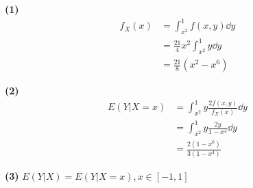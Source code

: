 \documentclass{article}
\begin{document}
    \textbf{(1)}
    \begin{equation}
        \begin{aligned}
            f_X(x) &= \int_{x^2}^1 f(x, y)\dd y \\
            &= \frac{21}{4}x^2\int_{x^2}^1 y\dd y \\
            &= \frac{21}{8}\left(x^2 - x^6\right)
        \end{aligned}
    \end{equation}

    \textbf{(2)}
    \begin{equation}
        \begin{aligned}
            E(Y|X = x) &= \int_{x^2}^{1} y\frac{2f(x, y)}{f_X(x)}\dd y \\
            &= \int_{x^2}^{1} y\frac{2y}{1 - x^4}\dd y \\
            &= \frac{2(1 - x^6)}{3(1 - x^4)}
        \end{aligned}
    \end{equation}

    \textbf{(3)} $E(Y|X) = E(Y|X = x), x\in [-1, 1]$
\end{document}
